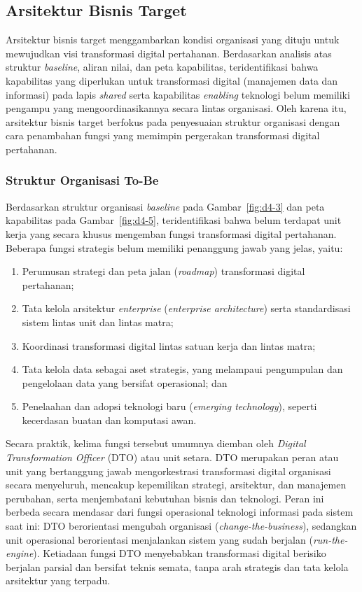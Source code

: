 \subsection{Arsitektur Bisnis Target}

Arsitektur bisnis target menggambarkan kondisi organisasi yang dituju untuk mewujudkan visi transformasi digital pertahanan. Berdasarkan analisis atas struktur \textit{baseline}, aliran nilai, dan peta kapabilitas, teridentifikasi bahwa kapabilitas yang diperlukan untuk transformasi digital (manajemen data dan informasi) pada lapis \textit{shared} serta kapabilitas \textit{enabling} teknologi belum memiliki pengampu yang mengoordinasikannya secara lintas organisasi. Oleh karena itu, arsitektur bisnis target berfokus pada penyesuaian struktur organisasi dengan cara penambahan fungsi yang memimpin pergerakan transformasi digital pertahanan.

\subsubsection{Struktur Organisasi To-Be}

Berdasarkan struktur organisasi \textit{baseline} pada Gambar~\ref{fig:d4-3} dan peta kapabilitas pada Gambar~\ref{fig:d4-5}, teridentifikasi bahwa belum terdapat unit kerja yang secara khusus mengemban fungsi transformasi digital pertahanan. Beberapa fungsi strategis belum memiliki penanggung jawab yang jelas, yaitu:

\begin{enumerate}[label=\alph*.]
  \item Perumusan strategi dan peta jalan (\textit{roadmap}) transformasi digital pertahanan;
  \item Tata kelola arsitektur \textit{enterprise} (\textit{enterprise architecture}) serta standardisasi sistem lintas unit dan lintas matra;
  \item Koordinasi transformasi digital lintas satuan kerja dan lintas matra;
  \item Tata kelola data sebagai aset strategis, yang melampaui pengumpulan dan pengelolaan data yang bersifat operasional; dan
  \item Penelaahan dan adopsi teknologi baru (\textit{emerging technology}), seperti kecerdasan buatan dan komputasi awan.
\end{enumerate}

Secara praktik, kelima fungsi tersebut umumnya diemban oleh \textit{Digital Transformation Officer} (DTO) atau unit setara. DTO merupakan peran atau unit yang bertanggung jawab mengorkestrasi transformasi digital organisasi secara menyeluruh, mencakup kepemilikan strategi, arsitektur, dan manajemen perubahan, serta menjembatani kebutuhan bisnis dan teknologi. Peran ini berbeda secara mendasar dari fungsi operasional teknologi informasi pada sistem saat ini: DTO berorientasi mengubah organisasi (\textit{change-the-business}), sedangkan unit operasional berorientasi menjalankan sistem yang sudah berjalan (\textit{run-the-engine}). Ketiadaan fungsi DTO menyebabkan transformasi digital berisiko berjalan parsial dan bersifat teknis semata, tanpa arah strategis dan tata kelola arsitektur yang terpadu.

